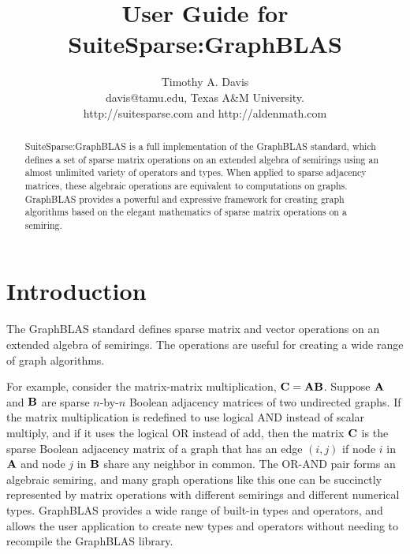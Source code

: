 \documentclass[12pt]{article}
\title{User Guide for SuiteSparse:GraphBLAS}
\author{Timothy A. Davis \\
\small
davis@tamu.edu, Texas A\&M University. \\
\small
http://suitesparse.com and http://aldenmath.com
}
\begin{document}
\maketitle

\begin{abstract}
SuiteSparse:GraphBLAS is a full implementation of the GraphBLAS standard,
which defines a set of sparse matrix operations on an extended algebra of
semirings using an almost unlimited variety of operators and types.  When
applied to sparse adjacency matrices, these algebraic operations are equivalent
to computations on graphs.  GraphBLAS provides a powerful and expressive
framework for creating graph algorithms based on the elegant mathematics of
sparse matrix operations on a semiring.
\end{abstract}

\newpage
{\small
\tableofcontents
}

\newpage
\section{Introduction} %
\label{intro}

The GraphBLAS standard defines sparse matrix and vector operations on an
extended algebra of semirings.  The operations are useful for creating a wide
range of graph algorithms.

For example, consider the matrix-matrix multiplication, ${\bf C=AB}$.  Suppose
${\bf A}$ and ${\bf B}$ are sparse $n$-by-$n$ Boolean adjacency matrices of two
undirected graphs.  If the matrix multiplication is redefined to use logical
AND instead of scalar multiply, and if it uses the logical OR instead of add,
then the matrix ${\bf C}$ is the sparse Boolean adjacency matrix of a graph
that has an edge $(i,j)$ if node $i$ in ${\bf A}$ and node $j$ in ${\bf B}$
share any neighbor in common.  The OR-AND pair forms an algebraic semiring, and
many graph operations like this one can be succinctly represented by matrix
operations with different semirings and different numerical types.  GraphBLAS
provides a wide range of built-in types and operators, and allows the user
application to create new types and operators without needing to recompile the
GraphBLAS library.
\end{document}
